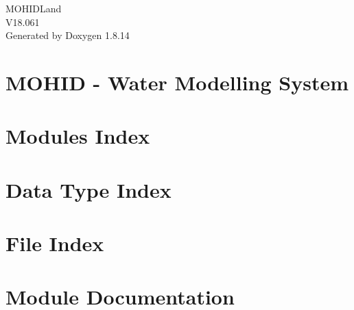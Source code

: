 \documentclass[twoside]{book}
\newcommand{\+}{\discretionary{\mbox{\scriptsize$\hookleftarrow$}}{}{}}
\newcommand{\clearemptydoublepage}{%
  \newpage{\pagestyle{empty}\cleardoublepage}%
}
\begin{document}
\hypersetup{pageanchor=false,
             bookmarksnumbered=true,
             pdfencoding=unicode
            }
\begin{titlepage}
\vspace*{7cm}
\begin{center}%
{\Large M\+O\+H\+I\+D\+Land \\[1ex]\large V18.\+061 }\\
\vspace*{1cm}
{\large Generated by Doxygen 1.8.14}\\
\end{center}
\end{titlepage}
\clearemptydoublepage
{}
\tableofcontents
\clearemptydoublepage
{}
\hypersetup{pageanchor=true}

\chapter{M\+O\+H\+ID -\/ Water Modelling System}
\label{index}\hypertarget{index}{}
\chapter{Modules Index}

\chapter{Data Type Index}

\chapter{File Index}

\chapter{Module Documentation}









\end{document}
